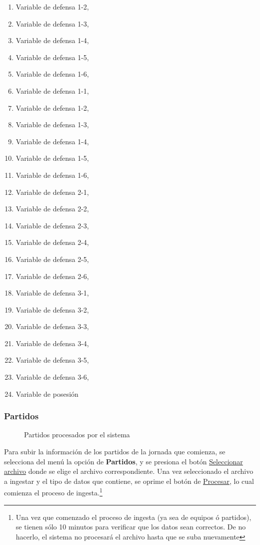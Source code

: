 \begin{enumerate}
	\item Variable de defensa 1-2, 
	\item Variable de defensa 1-3, 
	\item Variable de defensa 1-4, 
	\item Variable de defensa 1-5, 
	\item Variable de defensa 1-6, 
	\item Variable de defensa 1-1,
	\item Variable de defensa 1-2, 
	\item Variable de defensa 1-3, 
	\item Variable de defensa 1-4, 
	\item Variable de defensa 1-5, 
	\item Variable de defensa 1-6, 
	\item Variable de defensa 2-1, 
	\item Variable de defensa 2-2, 
	\item Variable de defensa 2-3, 
	\item Variable de defensa 2-4, 
	\item Variable de defensa 2-5, 
	\item Variable de defensa 2-6, 
	\item Variable de defensa 3-1, 
	\item Variable de defensa 3-2, 
	\item Variable de defensa 3-3, 
	\item Variable de defensa 3-4, 
	\item Variable de defensa 3-5, 
	\item Variable de defensa 3-6, 
	\item Variable de posesión
\end{enumerate}

\subsubsection{Partidos}
\begin{figure}[!htb]\centering
   \begin {minipage}{1\textwidth}
     \caption{Partidos procesados por el sistema}
	 \label{Fig:partidos}
   \end{minipage}
\end{figure}

Para subir la información de los partidos de la jornada que comienza, se selecciona del menú la opción de \textbf{Partidos}, y se presiona el botón \underline{Seleccionar archivo} donde se elige el archivo correspondiente.
Una vez seleccionado el archivo a ingestar y el tipo de datos que contiene, se oprime el botón de \underline{Procesar}, lo cual comienza el proceso de ingesta.\footnote{Una vez que comenzado el proceso de ingesta (ya sea de equipos ó partidos), se tienen sólo 10 minutos para verificar que los datos sean correctos. De no hacerlo, el sistema no procesará el archivo hasta que se suba nuevamente}

